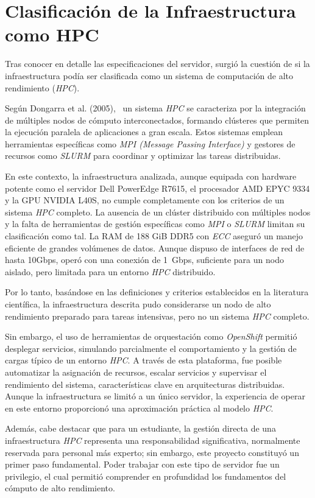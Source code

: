 \newpage
\section{Clasificación de la Infraestructura como HPC}
Tras conocer en detalle las especificaciones del servidor, surgió la cuestión de si la infraestructura podía ser clasificada como un sistema de computación de alto rendimiento (\textit{HPC}).

Según Dongarra et al. (2005),~\cite{ref20} un sistema \textit{HPC} se caracteriza por la integración de múltiples nodos de cómputo interconectados, formando clústeres que permiten la ejecución paralela de aplicaciones a gran escala. Estos sistemas emplean herramientas específicas como \textit{MPI (Message Passing Interface)} y gestores de recursos como \textit{SLURM} para coordinar y optimizar las tareas distribuidas.

En este contexto, la infraestructura analizada, aunque equipada con hardware potente como el servidor Dell PowerEdge R7615, el procesador AMD EPYC 9334 y la GPU NVIDIA L40S, no cumple completamente con los criterios de un sistema \textit{HPC} completo. La ausencia de un clúster distribuido con múltiples nodos y la falta de herramientas de gestión específicas como \textit{MPI} o \textit{SLURM} limitan su clasificación como tal. La RAM de 188 GiB DDR5 con \textit{ECC} aseguró un manejo eficiente de grandes volúmenes de datos. Aunque dispuso de interfaces de red de hasta 10Gbps, operó con una conexión de 1~Gbps, suficiente para un nodo aislado, pero limitada para un entorno \textit{HPC} distribuido.

Por lo tanto, basándose en las definiciones y criterios establecidos en la literatura científica, la infraestructura descrita pudo considerarse un nodo de alto rendimiento preparado para tareas intensivas, pero no un sistema \textit{HPC} completo.

Sin embargo, el uso de herramientas de orquestación como \textit{OpenShift} permitió desplegar servicios, simulando parcialmente el comportamiento y la gestión de cargas típico de un entorno \textit{HPC}. A través de esta plataforma, fue posible automatizar la asignación de recursos, escalar servicios y supervisar el rendimiento del sistema, características clave en arquitecturas distribuidas. Aunque la infraestructura se limitó a un único servidor, la experiencia de operar en este entorno proporcionó una aproximación práctica al modelo \textit{HPC}.

Además, cabe destacar que para un estudiante, la gestión directa de una infraestructura \textit{HPC} representa una responsabilidad significativa, normalmente reservada para personal más experto; sin embargo, este proyecto constituyó un primer paso fundamental. Poder trabajar con este tipo de servidor fue un privilegio, el cual permitió comprender en profundidad los fundamentos del cómputo de alto rendimiento.

